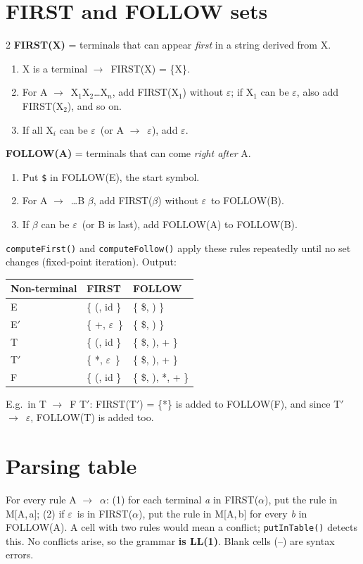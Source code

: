 \documentclass[10pt,a4paper]{article}
\newcommand{\eps}{$\varepsilon$}
\newcommand{\ar}{$\rightarrow$}
\newcommand{\tk}[1]{\texttt{#1}}
\begin{document}
\section{FIRST and FOLLOW sets}
\begin{multicols}{2}
\textbf{FIRST(X)} = terminals that can appear \emph{first} in a string derived from X.
\begin{enumerate}
\item X is a terminal \ar\ FIRST(X) = \{X\}.
\item For A \ar\ X$_1$X$_2$\dots X$_n$, add FIRST(X$_1$) without \eps; if X$_1$ can be \eps, also add FIRST(X$_2$), and so on.
\item If all X$_i$ can be \eps\ (or A \ar\ \eps), add \eps.
\end{enumerate}
\columnbreak
\textbf{FOLLOW(A)} = terminals that can come \emph{right after} A.
\begin{enumerate}
\item Put \tk{\$} in FOLLOW(E), the start symbol.
\item For A \ar\ \dots B $\beta$, add FIRST($\beta$) without \eps\ to FOLLOW(B).
\item If $\beta$ can be \eps\ (or B is last), add FOLLOW(A) to FOLLOW(B).
\end{enumerate}
\end{multicols}
\vspace{-6pt}
\tk{computeFirst()} and \tk{computeFollow()} apply these rules repeatedly until no set changes (fixed-point iteration). Output:

\begin{center}
\begin{tabular}{lll}
\toprule
Non-terminal & FIRST & FOLLOW \\
\midrule
E    & \{ (, id \}   & \{ \$, ) \} \\
E$'$ & \{ +, \eps\ \} & \{ \$, ) \} \\
T    & \{ (, id \}   & \{ \$, ), + \} \\
T$'$ & \{ *, \eps\ \} & \{ \$, ), + \} \\
F    & \{ (, id \}   & \{ \$, ), *, + \} \\
\bottomrule
\end{tabular}
\end{center}
E.g.\ in T \ar\ F T$'$: FIRST(T$'$) = \{*\} is added to FOLLOW(F), and since T$'$ \ar\ \eps, FOLLOW(T) is added too.

\section{Parsing table}
For every rule A \ar\ $\alpha$: (1) for each terminal \emph{a} in FIRST($\alpha$), put the rule in M[A,\,a];
(2) if \eps\ is in FIRST($\alpha$), put the rule in M[A,\,b] for every \emph{b} in FOLLOW(A).
A cell with two rules would mean a conflict; \tk{putInTable()} detects this. No conflicts arise, so the grammar
\textbf{is LL(1)}. Blank cells (--) are syntax errors.
\end{document}
